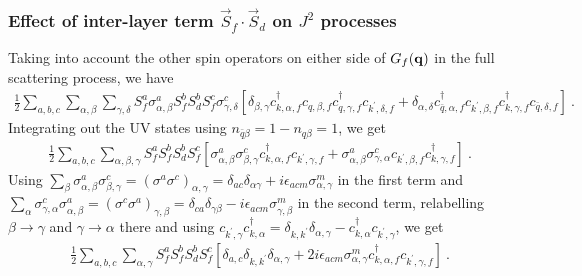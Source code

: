 \documentclass[%
reprint,
superscriptaddress,
groupedaddress,
superscriptaddress,
onecolumn,
10pt
]{revtex4-2}
\begin{document}
\subsubsection*{Effect of inter-layer term \(\vec{S}_f\cdot\vec{S}_d\) on \(J^2\) processes}
Taking into account the other spin operators on either side of \(G_f({\bf q})\) in the full scattering process, we have
\begin{equation}\begin{aligned}
	\frac{1}{2}\sum_{a,b,c} \sum_{\alpha,\beta} \sum_{\gamma,\delta} S_f^a \sigma^a_{\alpha,\beta} S_f^b S_d^b S_f^c \sigma^c_{\gamma,\delta}\left[\delta_{\beta,\gamma}c^\dagger_{k,\alpha,f}c_{q,\beta,f} c^\dagger_{q,\gamma,f}c_{k^\prime,\delta,f} + \delta_{\alpha,\delta}c^\dagger_{\bar q,\alpha,f}c_{k^\prime,\beta,f} c^\dagger_{k,\gamma,f}c_{\bar q,\delta,f}\right]~.
\end{aligned}\end{equation}
Integrating out the UV states using \(n_{\bar q\beta} = 1 - n_{q\beta} = 1\), we get
\begin{equation}\begin{aligned}
	\frac{1}{2}\sum_{a,b,c} \sum_{\alpha,\beta,\gamma} S_f^a S_f^b S_d^b S_f^c \left[\sigma^a_{\alpha,\beta} \sigma^c_{\beta,\gamma}c^\dagger_{k,\alpha,f} c_{k^\prime,\gamma,f} + \sigma^a_{\alpha,\beta} \sigma^c_{\gamma,\alpha}c_{k^\prime,\beta,f} c^\dagger_{k,\gamma,f}\right]~.
\end{aligned}\end{equation}
Using \(\sum_\beta \sigma^a_{\alpha,\beta} \sigma^c_{\beta,\gamma} = (\sigma^a \sigma^c)_{\alpha,\gamma} = \delta_{ac}\delta_{\alpha\gamma} + i \epsilon_{acm} \sigma^m_{\alpha,\gamma}\) in the first term and \(\sum_\alpha \sigma^c_{\gamma,\alpha} \sigma^a_{\alpha,\beta} = (\sigma^c \sigma^a)_{\gamma,\beta} = \delta_{ca}\delta_{\gamma\beta} - i\epsilon_{acm}\sigma^m_{\gamma,\beta}\) in the second term, relabelling \(\beta \to \gamma\) and \(\gamma \to \alpha\) there and using \(c_{k^\prime,\gamma} c^\dagger_{k,\alpha} = \delta_{k,k^\prime}\delta_{\alpha,\gamma} - c^\dagger_{k,\alpha} c_{k^\prime,\gamma}\), we get
\begin{equation}\begin{aligned}\label{interm1}
	\frac{1}{2}\sum_{a,b,c} \sum_{\alpha,\gamma} S_f^a S_f^b S_d^b S_f^c \left[\delta_{a,c}\delta_{k,k^\prime}\delta_{\alpha,\gamma} + 2i \epsilon_{acm} \sigma^m_{\alpha,\gamma}c^\dagger_{k,\alpha,f} c_{k^\prime,\gamma,f}\right]~.
\end{aligned}\end{equation}
\end{document}
